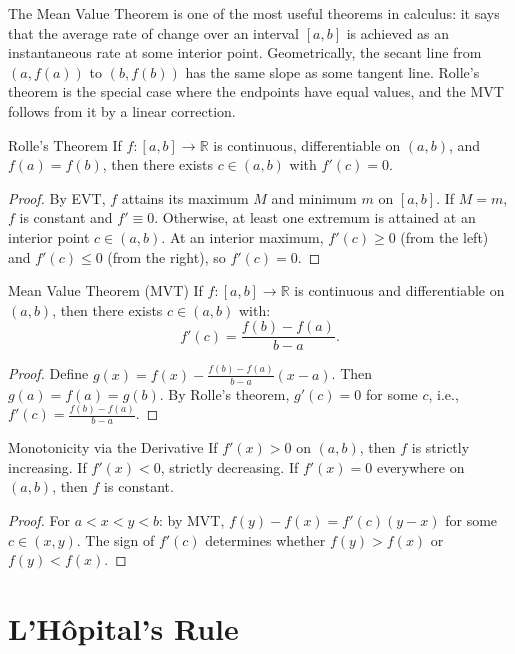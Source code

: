 \documentclass[12pt, openany]{book}
\theoremstyle{plain}
\theoremstyle{definition}
\theoremstyle{remark}
\newcommand{\R}{\mathbb{R}}
\begin{document}
The Mean Value Theorem is one of the most useful theorems in calculus: it says that the average rate of change over an interval $[a,b]$ is achieved as an instantaneous rate at some interior point.  Geometrically, the secant line from $(a, f(a))$ to $(b, f(b))$ has the same slope as some tangent line.  Rolle's theorem is the special case where the endpoints have equal values, and the MVT follows from it by a linear correction.

\begin{thmbox}{Rolle's Theorem}
If $f : [a,b] \to \R$ is continuous, differentiable on $(a,b)$, and $f(a) = f(b)$, then there exists $c \in (a,b)$ with $f'(c) = 0$.
\end{thmbox}
\color{black}

\begin{proof}
By EVT, $f$ attains its maximum $M$ and minimum $m$ on $[a,b]$. If $M = m$, $f$ is constant and $f' \equiv 0$. Otherwise, at least one extremum is attained at an interior point $c \in (a,b)$. At an interior maximum, $f'(c) \geq 0$ (from the left) and $f'(c) \leq 0$ (from the right), so $f'(c) = 0$.
\end{proof}

\begin{thmbox}{Mean Value Theorem (MVT)}
If $f : [a,b] \to \R$ is continuous and differentiable on $(a,b)$, then there exists $c \in (a,b)$ with:
\[ f'(c) = \frac{f(b) - f(a)}{b - a}. \]
\end{thmbox}
\color{black}

\begin{proof}
Define $g(x) = f(x) - \frac{f(b)-f(a)}{b-a}(x-a)$. Then $g(a) = f(a) = g(b)$. By Rolle's theorem, $g'(c) = 0$ for some $c$, i.e., $f'(c) = \frac{f(b)-f(a)}{b-a}$.
\end{proof}

\begin{corbox}{Monotonicity via the Derivative}
If $f'(x) > 0$ on $(a,b)$, then $f$ is strictly increasing. If $f'(x) < 0$, strictly decreasing.
If $f'(x) = 0$ everywhere on $(a,b)$, then $f$ is constant.
\end{corbox}
\color{black}

\begin{proof}
For $a < x < y < b$: by MVT, $f(y) - f(x) = f'(c)(y-x)$ for some $c \in (x,y)$. The sign of $f'(c)$ determines whether $f(y) > f(x)$ or $f(y) < f(x)$.
\end{proof}

\section{L'H\^opital's Rule}
\end{document}
